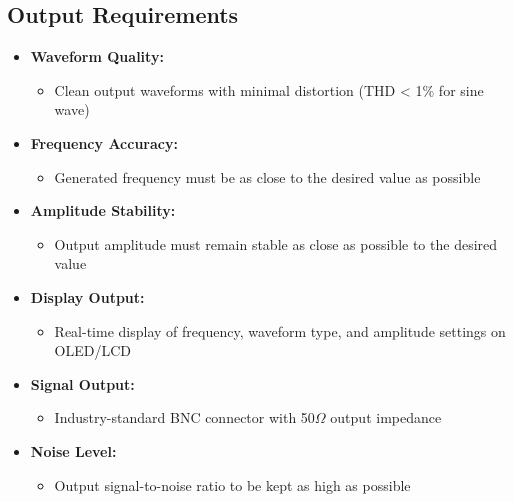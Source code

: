 \documentclass[a4paper,12pt]{article}
\begin{document}
\subsection{Output Requirements}
\begin{itemize}
    \item \textbf{Waveform Quality:}
    \begin{itemize}
        \item Clean output waveforms with minimal distortion (THD < 1\% for sine wave)
    \end{itemize}
    \item \textbf{Frequency Accuracy: }
    \begin{itemize}
        \item Generated frequency must be as close to the desired value as possible
    \end{itemize}
    \item \textbf{Amplitude Stability:}
    \begin{itemize}
        \item Output amplitude must remain stable as close as possible to the desired value
    \end{itemize}
    \item \textbf{Display Output:}
    \begin{itemize}
        \item Real-time display of frequency, waveform type, and amplitude settings on OLED/LCD
    \end{itemize}
    \item \textbf{Signal Output:}
    \begin{itemize}
        \item Industry-standard BNC connector with 50\(\Omega\) output impedance
    \end{itemize}
    \item \textbf{Noise Level:}
    \begin{itemize}
        \item Output signal-to-noise ratio to be kept as high as possible
    \end{itemize}
\end{itemize}
\end{document}
